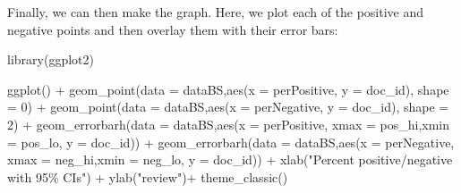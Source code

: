 \documentclass[
]{article}
\newenvironment{Shaded}{\begin{snugshade}}{\end{snugshade}}
\newcommand{\AttributeTok}[1]{\textcolor[rgb]{0.77,0.63,0.00}{#1}}
\newcommand{\DecValTok}[1]{\textcolor[rgb]{0.00,0.00,0.81}{#1}}
\newcommand{\FloatTok}[1]{\textcolor[rgb]{0.00,0.00,0.81}{#1}}
\newcommand{\FunctionTok}[1]{\textcolor[rgb]{0.00,0.00,0.00}{#1}}
\newcommand{\NormalTok}[1]{#1}
\newcommand{\OtherTok}[1]{\textcolor[rgb]{0.56,0.35,0.01}{#1}}
\newcommand{\SpecialCharTok}[1]{\textcolor[rgb]{0.00,0.00,0.00}{#1}}
\newcommand{\StringTok}[1]{\textcolor[rgb]{0.31,0.60,0.02}{#1}}
\begin{document}
\begin{Shaded}
\end{Shaded}

Finally, we can then make the graph. Here, we plot each of the positive and negative points and then overlay them with their error bars:

\begin{Shaded}
\begin{Highlighting}[]
\FunctionTok{library}\NormalTok{(ggplot2)}

\FunctionTok{ggplot}\NormalTok{() }\SpecialCharTok{+}
 \FunctionTok{geom\_point}\NormalTok{(}\AttributeTok{data =}\NormalTok{ dataBS,}\FunctionTok{aes}\NormalTok{(}\AttributeTok{x =}\NormalTok{ perPositive, }\AttributeTok{y =}\NormalTok{ doc\_id), }\AttributeTok{shape =} \DecValTok{0}\NormalTok{) }\SpecialCharTok{+}
 \FunctionTok{geom\_point}\NormalTok{(}\AttributeTok{data =}\NormalTok{ dataBS,}\FunctionTok{aes}\NormalTok{(}\AttributeTok{x =}\NormalTok{ perNegative, }\AttributeTok{y =}\NormalTok{ doc\_id), }\AttributeTok{shape =} \DecValTok{2}\NormalTok{) }\SpecialCharTok{+}
 \FunctionTok{geom\_errorbarh}\NormalTok{(}\AttributeTok{data =}\NormalTok{ dataBS,}\FunctionTok{aes}\NormalTok{(}\AttributeTok{x =}\NormalTok{ perPositive, }\AttributeTok{xmax =}\NormalTok{ pos\_hi,}\AttributeTok{xmin =}\NormalTok{ pos\_lo, }\AttributeTok{y =}\NormalTok{ doc\_id)) }\SpecialCharTok{+}
 \FunctionTok{geom\_errorbarh}\NormalTok{(}\AttributeTok{data =}\NormalTok{ dataBS,}\FunctionTok{aes}\NormalTok{(}\AttributeTok{x =}\NormalTok{ perNegative, }\AttributeTok{xmax =}\NormalTok{ neg\_hi,}\AttributeTok{xmin =}\NormalTok{ neg\_lo, }\AttributeTok{y =}\NormalTok{ doc\_id)) }\SpecialCharTok{+}
 \FunctionTok{xlab}\NormalTok{(}\StringTok{"Percent positive/negative with 95\% CIs"}\NormalTok{) }\SpecialCharTok{+}
 \FunctionTok{ylab}\NormalTok{(}\StringTok{"review"}\NormalTok{)}\SpecialCharTok{+}
 \FunctionTok{theme\_classic}\NormalTok{()}
\end{Highlighting}
\end{Shaded}
\end{document}
